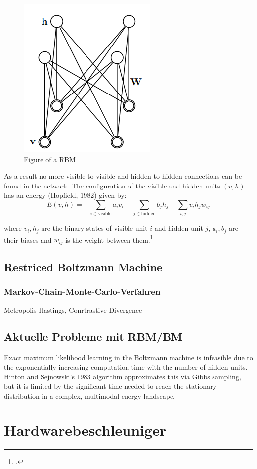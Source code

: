 \begin{figure}[H]
    \centering
    \includegraphics[width=0.25\linewidth]{graphics/RBM_Modell.png}
    \caption{Figure of a \ac{RBM}}
\end{figure}
As a result no more visible-to-visible and hidden-to-hidden connections can be found in the network.
The configuration of the visible and hidden units \( (v, h) \) has an energy (Hopfield, 1982) given by:
\begin{equation}
E(v, h) = - \sum_{i \in \text{visible}} a_i v_i - \sum_{j \in \text{hidden}} b_j h_j - \sum_{i,j} v_i h_j w_{ij}
\end{equation}

where \( v_i, h_j \) are the binary states of visible unit \( i \) and hidden unit \( j \), \( a_i, b_j \) are their biases and \( w_{ij} \) is the weight between them.\footcite[Vgl.][3-4]{hintonPracticalGuideTraining2012a}

\subsection{Restriced Boltzmann Machine}


\subsubsection{Markov-Chain-Monte-Carlo-Verfahren}
Metropolis Hastings,
Conrtrastive Divergence

\subsection{Aktuelle Probleme mit RBM/BM}


Exact maximum likelihood learning in the Boltzmann machine is infeasible due to the exponentially increasing computation time with the number of hidden units.
Hinton and Sejnowski's 1983 algorithm approximates this via Gibbs sampling, but it is limited by the significant time needed to reach the stationary distribution in a complex, multimodal energy landscape.

\section{Hardwarebeschleuniger}
